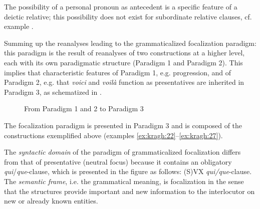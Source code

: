 \documentclass[output=paper]{langsci/langscibook}
\begin{document}
The possibility of a personal pronoun as antecedent is a specific feature of a deictic relative; this possibility does not exist for subordinate relative clauses, cf. example . 

Summing up the reanalyses leading to the grammaticalized focalization paradigm: this paradigm is the result of reanalyses of two constructions at a higher level, each with its own paradigmatic structure (Paradigm 1 and Paradigm 2). This implies that characteristic features of Paradigm 1, e.g. progression, and of Paradigm 2, e.g. that \textit{voici} and \textit{voilà} function as presentatives are inherited in Paradigm 3, as schematized in .

\begin{figure}
\caption{From Paradigm 1 and 2 to Paradigm 3\label{fig:kragh:5}}
\end{figure}

The focalization paradigm is presented in Paradigm 3 and is composed of the constructions exemplified above (examples \ref{ex:kragh:22}--\ref{ex:kragh:27}).

The \textit{syntactic} \textit{domain} of the paradigm of grammaticalized focalization differs from that of presentative (neutral focus) because it contains an obligatory \textit{qui}\slash\textit{que}-clause, which is presented in the figure as follows: (S)VX \textit{qui/que}{}-clause. The \textit{semantic frame}, i.e. the grammatical meaning, is focalization in the sense that the structures provide important and new information to the interlocutor on new or already known entities. 
\end{document}
